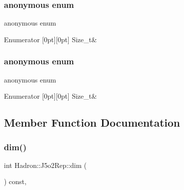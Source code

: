 \subsubsection{\texorpdfstring{anonymous enum}{anonymous enum}}
{\footnotesize\ttfamily anonymous enum}

\begin{DoxyEnumFields}{Enumerator}
[0pt][0pt]{}\mbox{\label{structHadron_1_1J5o2Rep_aaf46921e69a05786461979f9d80e5c4fa901b5b392ebf13c294bd161aef19a01b}} 
Size\+\_\+t&\\
\hline

\end{DoxyEnumFields}
\mbox{\label{structHadron_1_1J5o2Rep_aaf46921e69a05786461979f9d80e5c4f}} 
\subsubsection{\texorpdfstring{anonymous enum}{anonymous enum}}
{\footnotesize\ttfamily anonymous enum}

\begin{DoxyEnumFields}{Enumerator}
[0pt][0pt]{}\mbox{\label{structHadron_1_1J5o2Rep_aaf46921e69a05786461979f9d80e5c4fa901b5b392ebf13c294bd161aef19a01b}} 
Size\+\_\+t&\\
\hline

\end{DoxyEnumFields}


\subsection{Member Function Documentation}
\mbox{\label{structHadron_1_1J5o2Rep_a0a185f6fcbb5ce65c0af1615cf1f4e76}} 
\subsubsection{\texorpdfstring{dim()}{dim()}\hspace{0.1cm}{\footnotesize\ttfamily [1/3]}}
{\footnotesize\ttfamily int Hadron\+::\+J5o2\+Rep\+::dim (\begin{DoxyParamCaption}{ }\end{DoxyParamCaption}) const\hspace{0.3cm}{\ttfamily [inline]}, {\ttfamily [virtual]}}



